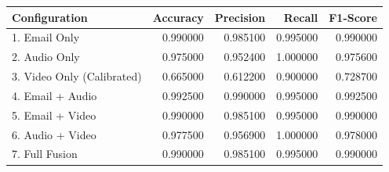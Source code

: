 \begin{tabular}{lrrrr}
\toprule
Configuration & Accuracy & Precision & Recall & F1-Score \\
\midrule
1. Email Only & 0.990000 & 0.985100 & 0.995000 & 0.990000 \\
2. Audio Only & 0.975000 & 0.952400 & 1.000000 & 0.975600 \\
3. Video Only (Calibrated) & 0.665000 & 0.612200 & 0.900000 & 0.728700 \\
4. Email + Audio & 0.992500 & 0.990000 & 0.995000 & 0.992500 \\
5. Email + Video & 0.990000 & 0.985100 & 0.995000 & 0.990000 \\
6. Audio + Video & 0.977500 & 0.956900 & 1.000000 & 0.978000 \\
7. Full Fusion & 0.990000 & 0.985100 & 0.995000 & 0.990000 \\
\bottomrule
\end{tabular}
